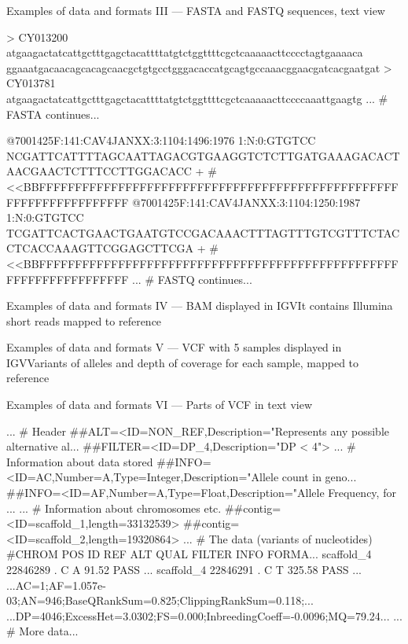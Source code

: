 \documentclass[compress, xelatex, 11pt, xcolor=svgnames, aspectratio=169,
	hyperref={
		bookmarks=true,
		unicode=true,
		colorlinks=true,
		pdftitle={Molecular data in R},
		plainpages=false,
		pdfauthor={Vojtech Zeisek},
		pdfsubject={Course about phylogeny and evolution in R},
		pdfcreator={XeLaTeX},
		pdfkeywords={R, evolution, phylogeny, molecular data},
		linkcolor=Crimson, %
		anchorcolor=Magenta, %
		citecolor=Magenta, %
		filecolor=Magenta, %
		menucolor=Magenta, %
		urlcolor=DodgerBlue, %
		},
	url={hyphens, lowtilde} %
	]{beamer}
\renewcommand{\texttt}[1]{\colorbox{Beige}{{\ttfamily #1}}}
\begin{document}
\begin{frame}[fragile]{Examples of data and formats III --- FASTA and FASTQ sequences, text view}
	\begin{spluscode}
    > CY013200
    atgaagactatcattgctttgagctacattttatgtctggttttcgctcaaaaacttcccctagtgaaaaca
    ggaaatgacaacagcacagcaacgctgtgcctgggacaccatgcagtgccaaacggaacgatcacgaatgat
    > CY013781
    atgaagactatcattgctttgagctacattttatgtctggttttcgctcaaaaacttccccaaattgaagtg
    ... # FASTA continues...
	\end{spluscode}
	\vfill
	\begin{spluscode}
    @7001425F:141:CAV4JANXX:3:1104:1496:1976 1:N:0:GTGTCC
    NCGATTCATTTTAGCAATTAGACGTGAAGGTCTCTTGATGAAAGACACTAACGAACTCTTTCCTTGGACACC
    +
    #<<BBFFFFFFFFFFFFFFFFFFFFFFFFFFFFFFFFFFFFFFFFFFFFFFFFFFFFFFFFFFFFFFFFFFF
    @7001425F:141:CAV4JANXX:3:1104:1250:1987 1:N:0:GTGTCC
    TCGATTCACTGAACTGAATGTCCGACAAACTTTAGTTTGTCGTTTCTACCTCACCAAAGTTCGGAGCTTCGA
    +
    #<<BBFFFFFFFFFFFFFFFFFFFFFFFFFFFFFFFFFFFFFFFFFFFFFFFFFFFFFFFFFFFFFFFFFFF
    ... # FASTQ continues...
	\end{spluscode}
\end{frame}

\begin{frame}{Examples of data and formats IV --- BAM displayed in IGV}{It contains Illumina short reads mapped to reference}
	\begin{center}
		\texttt{[image: bam\_igv.png]}
	\end{center}
\end{frame}

\begin{frame}{Examples of data and formats V --- VCF with 5 samples displayed in IGV}{Variants of alleles and depth of coverage for each sample, mapped to reference}
	\begin{center}
		\texttt{[image: vcf\_igv.png]}
	\end{center}
\end{frame}

\begin{frame}[fragile]{Examples of data and formats VI --- Parts of VCF in text view}
	\begin{spluscode}
    ... # Header
    ##ALT=<ID=NON_REF,Description="Represents any possible alternative al...
    ##FILTER=<ID=DP_4,Description="DP < 4">
    ... # Information about data stored
    ##INFO=<ID=AC,Number=A,Type=Integer,Description="Allele count in geno...
    ##INFO=<ID=AF,Number=A,Type=Float,Description="Allele Frequency, for ...
    ... # Information about chromosomes etc.
    ##contig=<ID=scaffold_1,length=33132539>
    ##contig=<ID=scaffold_2,length=19320864>
    ... # The data (variants of nucleotides)
    #CHROM  POS     ID      REF     ALT     QUAL    FILTER  INFO    FORMA...
    scaffold_4      22846289        .       C       A       91.52   PASS ...
    scaffold_4      22846291        .       C       T       325.58  PASS ...
    ...AC=1;AF=1.057e-03;AN=946;BaseQRankSum=0.825;ClippingRankSum=0.118;...
    ...DP=4046;ExcessHet=3.0302;FS=0.000;InbreedingCoeff=-0.0096;MQ=79.24...
    ... # More data...
	\end{spluscode}
\end{frame}
\end{document}
